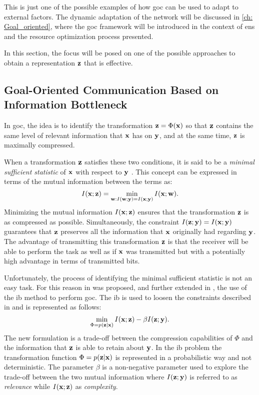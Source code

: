 This is just one of the possible examples of how \gls{goc} can be used to adapt to external factors. The dynamic adaptation of the network will be discussed in \cref{ch: Goal_oriented}, where the \gls{goc} framework will be introduced in the context of \glspl{en} and the resource optimization process presented.

In this section, the focus will be posed on one of the possible approaches to obtain a representation $\mathbf{z}$ that is effective.

\subsection{Goal-Oriented Communication Based on Information Bottleneck} \label{sec: SEMCOM ib}

In \gls{goc}, the idea is to identify the transformation $\mathbf{z}=\Phi(\mathbf{x})$ so that $\mathbf{z}$ contains the same level of relevant information that $\mathbf{x}$ has on $\mathbf{y}$, and at the same time, $\mathbf{z}$ is maximally compressed.

When a transformation $\mathbf{z}$ satisfies these two conditions, it is said to be a \textit{minimal sufficient statistic} of $\mathbf{x}$ with respect to $\mathbf{y}$ \cite{Cover2006IT}. This concept can be expressed in terms of the mutual information between the terms as:
\begin{equation}
    I(\mathbf{x}; \mathbf{z}) = \min_{\mathbf{w}: I(\mathbf{w}; \mathbf{y}) = I(\mathbf{x}; \mathbf{y})} I(\mathbf{x}; \mathbf{w}).
    \label{eq: SEMCOM min_suff_stat}
\end{equation}
Minimizing the mutual information $I(\mathbf{x}; \mathbf{z})$ ensures that the transformation $\mathbf{z}$ is as compressed as possible. Simultaneously, the constraint $I(\mathbf{z}; \mathbf{y}) = I(\mathbf{x}; \mathbf{y})$ guarantees that $\mathbf{z}$ preserves all the information that $\mathbf{x}$ originally had regarding $\mathbf{y}$.
The advantage of transmitting this transformation $\mathbf{z}$ is that the receiver will be able to perform the task as well as if $\mathbf{x}$ was transmitted but with a potentially high advantage in terms of transmitted bits.

Unfortunately, the process of identifying the minimal sufficient statistic is not an easy task. For this reason in \cite{Strinati20216G} was proposed, and further extended in \cite{Shao2021learning},  the use of the \gls{ib} method \cite{Tishby1999IB} to perform \gls{goc}. The \gls{ib} is used to loosen the constraints described in  and is represented as follows:
\begin{equation}
    \min_{\Phi=p(\mathbf{z}|\mathbf{x})} I(\mathbf{x}; \mathbf{z}) - \beta I(\mathbf{z}; \mathbf{y}).
    \label{eq: SEMCOM ib_problem}
\end{equation}
The new formulation is a trade-off between the compression capabilities of $\Phi$ and the information that $\mathbf{z}$ is able to retain about $\mathbf{y}$. In the \gls{ib} problem the transformation function $\Phi=p(\mathbf{z}|\mathbf{x})$ is represented in a probabilistic way and not deterministic. The parameter $\beta$ is a non-negative parameter used to explore the trade-off between the two mutual information where $I(\mathbf{z}; \mathbf{y})$ is referred to as \textit{relevance} while $I(\mathbf{x}; \mathbf{z})$ as \textit{complexity}.

